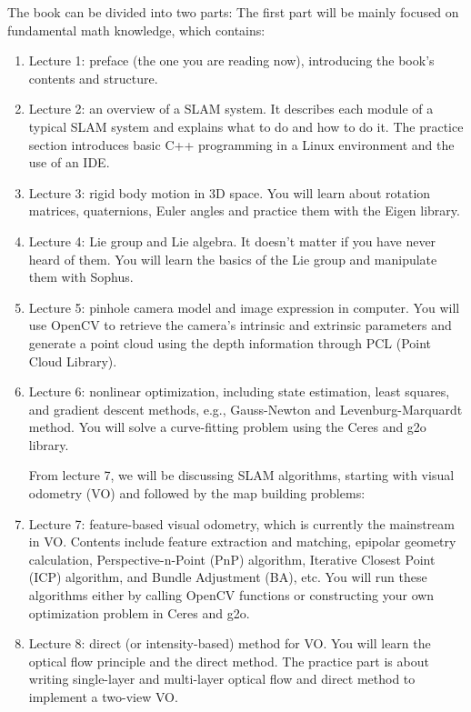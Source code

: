 The book can be divided into two parts: The first part will be mainly focused on fundamental math knowledge, which contains:
\begin{enumerate}
	\item Lecture 1: preface (the one you are reading now), introducing the book's contents and structure.
	\item Lecture 2: an overview of a SLAM system. It describes each module of a typical SLAM system and explains what to do and how to do it. The practice section introduces basic C++ programming in a Linux environment and the use of an IDE.
	\item Lecture 3: rigid body motion in 3D space. You will learn about rotation matrices, quaternions, Euler angles and practice them with the Eigen library.
	\item Lecture 4: Lie group and Lie algebra. It doesn't matter if you have never heard of them. You will learn the basics of the Lie group and manipulate them with Sophus.
	\item Lecture 5: pinhole camera model and image expression in computer. You will use OpenCV to retrieve the camera's intrinsic and extrinsic parameters and generate a point cloud using the depth information through PCL (Point Cloud Library).
	\item Lecture 6: nonlinear optimization, including state estimation, least squares, and gradient descent methods, e.g., Gauss-Newton and Levenburg-Marquardt method. You will solve a curve-fitting problem using the Ceres and g2o library.
	
	From lecture 7, we will be discussing SLAM algorithms, starting with visual odometry (VO) and followed by the map building problems: 
	
	\item Lecture 7: feature-based visual odometry, which is currently the mainstream in VO. Contents include feature extraction and matching, epipolar geometry calculation, Perspective-n-Point (PnP) algorithm, Iterative Closest Point (ICP) algorithm, and Bundle Adjustment (BA), etc. You will run these algorithms either by calling OpenCV functions or constructing your own optimization problem in Ceres and g2o.
	
	\item Lecture 8: direct (or intensity-based) method for VO. You will learn the optical flow principle and the direct method. The practice part is about writing single-layer and multi-layer optical flow and direct method to implement a two-view VO.
	

\end{enumerate}

